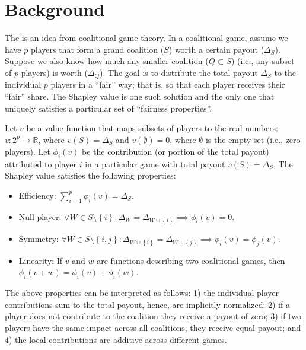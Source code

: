 \section{Background}

The  \citep{shapley-2016-value} is an idea from
coalitional game theory. In a coalitional game, assume we have \(p\)
players that form a grand coalition (\(S\)) worth a certain payout
(\(\Delta_S\)). Suppose we also know how much any smaller coalition
(\(Q \subset S\)) (i.e., any subset of \(p\) players) is worth
(\(\Delta_Q\)). The goal is to distribute the total payout \(\Delta_S\)
to the individual \(p\) players in a ``fair'' way; that is, so that each
player receives their ``fair'' share. The Shapley value is one such
solution and the only one that uniquely satisfies a particular set of
``fairness properties''.

Let \(v\) be a value function that maps subsets of players to the real
numbers: \(v : 2^p \rightarrow \mathbb{R}\), where
\(v\left(S\right) = \Delta_S\) and \(v\left(\emptyset\right) = 0\),
where \(\emptyset\) is the empty set (i.e., zero players). Let
\(\phi_i\left(v\right)\) be the contribution (or portion of the total
payout) attributed to player \(i\) in a particular game with total
payout \(v\left(S\right) = \Delta_S\). The Shapley value satisfies the
following properties:

\begin{itemize}

  \item Efficiency: $\sum_{i = 1} ^ p \phi_i\left(v\right) = \Delta_S $.
  
  \item Null player: $\forall W \in S \setminus \left\{i\right\}: \Delta_W = \Delta_{W \cup \left\{i\right\}} \implies \phi_i\left(v\right) = 0$.
  
  \item Symmetry: $\forall W \in S \setminus \left\{i, j\right\}: \Delta_{W \cup \left\{i\right\}} = \Delta_{W \cup \left\{j\right\}} \implies \phi_i\left(v\right) = \phi_j\left(v\right)$.
  
  \item Linearity: If $v$ and $w$ are functions describing two coalitional games, then $\phi_i\left(v + w\right) = \phi_i\left(v\right) + \phi_i\left(w\right)$.

\end{itemize}

The above properties can be interpreted as follows: 1) the individual
player contributions sum to the total payout, hence, are implicitly
normalized; 2) if a player does not contribute to the coalition they
receive a payout of zero; 3) if two players have the same impact across
all coalitions, they receive equal payout; and 4) the local
contributions are additive across different games.

